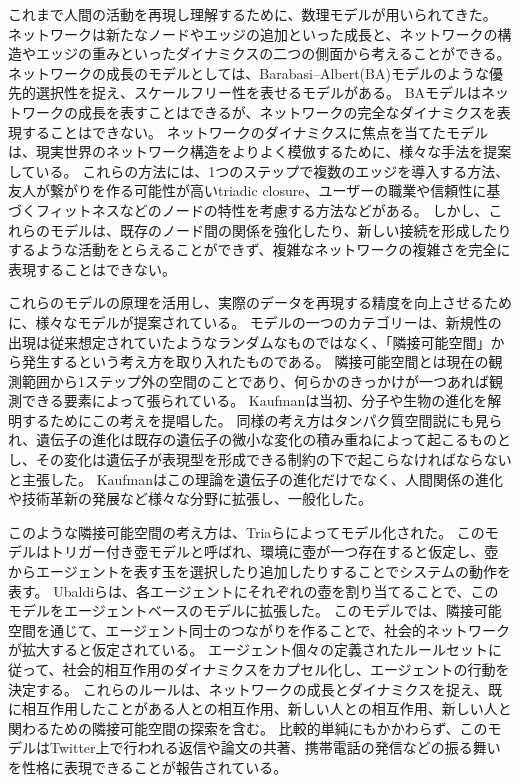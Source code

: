 \documentclass[uplatex,11pt,openany]{ujreport}
\begin{document}
    これまで人間の活動を再現し理解するために、数理モデルが用いられてきた。
    ネットワークは新たなノードやエッジの追加といった成長と、ネットワークの構造やエッジの重みといったダイナミクスの二つの側面から考えることができる。
    ネットワークの成長のモデルとしては、Barabasi--Albert(BA)モデルのような優先的選択性を捉え、スケールフリー性を表せるモデルがある\cite{barabasi_emergence_1999,barabasi_origin_2005,barabasi_scale-free_2009}。
    BAモデルはネットワークの成長を表すことはできるが、ネットワークの完全なダイナミクスを表現することはできない。
    ネットワークのダイナミクスに焦点を当てたモデルは、現実世界のネットワーク構造をよりよく模倣するために、様々な手法を提案している。
    これらの方法には、1つのステップで複数のエッジを導入する方法\cite{albert_topology_2000}、友人が繋がりを作る可能性が高いtriadic closure\cite{bianconi_triadic_2014}、ユーザーの職業や信頼性に基づくフィットネスなどのノードの特性を考慮する方法\cite{topirceanu_weighted_2018}などがある。
    しかし、これらのモデルは、既存のノード間の関係を強化したり、新しい接続を形成したりするような活動をとらえることができず、複雑なネットワークの複雑さを完全に表現することはできない。

    これらのモデルの原理を活用し、実際のデータを再現する精度を向上させるために、様々なモデルが提案されている。
    モデルの一つのカテゴリーは、新規性の出現は従来想定されていたようなランダムなものではなく、「隣接可能空間」から発生するという考え方を取り入れたものである\cite{monechi_waves_2017,suda_exploration_2022,ubaldi_emergence_2021}。
    隣接可能空間とは現在の観測範囲から1ステップ外の空間のことであり、何らかのきっかけが一つあれば観測できる要素によって張られている。
    Kaufmanは当初、分子や生物の進化を解明するためにこの考えを提唱した\cite{kauffman_origins_1993}。
    同様の考え方はタンパク質空間説にも見られ、遺伝子の進化は既存の遺伝子の微小な変化の積み重ねによって起こるものとし、その変化は遺伝子が表現型を形成できる制約の下で起こらなければならないと主張した\cite{maynard_smith_natural_1970}。
    Kaufmanはこの理論を遺伝子の進化だけでなく、人間関係の進化や技術革新の発展など様々な分野に拡張し、一般化した。

    このような隣接可能空間の考え方は、Triaら\cite{tria_dynamics_2014}によってモデル化された。
    このモデルはトリガー付き壺モデルと呼ばれ、環境に壺が一つ存在すると仮定し、壺からエージェントを表す玉を選択したり追加したりすることでシステムの動作を表す。
    Ubaldiらは、各エージェントにそれぞれの壺を割り当てることで、このモデルをエージェントベースのモデルに拡張した\cite{ubaldi_emergence_2021}。
    このモデルでは、隣接可能空間を通じて、エージェント同士のつながりを作ることで、社会的ネットワークが拡大すると仮定されている。
    エージェント個々の定義されたルールセットに従って、社会的相互作用のダイナミクスをカプセル化し、エージェントの行動を決定する。
    これらのルールは、ネットワークの成長とダイナミクスを捉え、既に相互作用したことがある人との相互作用、新しい人との相互作用、新しい人と関わるための隣接可能空間の探索を含む。
    比較的単純にもかかわらず、このモデルはTwitter上で行われる返信や論文の共著、携帯電話の発信などの振る舞いを性格に表現できることが報告されている\cite{ubaldi_emergence_2021}。
\end{document}
